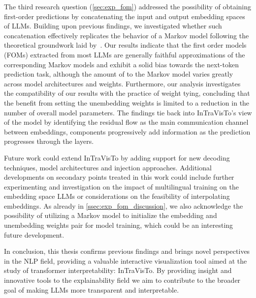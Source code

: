 The third research question (\cref{sec:exp_fom}) addressed the possibility of obtaining first-order predictions by concatenating the input and output embedding spaces of LLMs.
Building upon previous findings, we investigated whether such concatenation effectively replicates the behavior of a Markov model following the theoretical groundwork laid by~\citet{elhage2021}.
Our results indicate that the first order models (FOMs) extracted from most LLMs are generally faithful approximations of the corresponding Markov models and exhibit a solid bias towards the next-token prediction task, although the amount of  to the Markov model varies greatly across model architectures and weights.
Furthermore, our analysis investigates the compatibility of our results with the practice of weight tying, concluding that the benefit from setting the unembedding weights  is limited to a reduction in the number of overall model parameters. 
The  findings tie back into InTraVisTo's view of the model by identifying the residual flow as the main communication channel between embeddings,  components progressively add information as the prediction progresses through the layers.

Future work could extend InTraVisTo by adding support for new decoding techniques, model architectures and injection approaches.
Additional developments on  secondary points treated in this work could include further experimenting and investigation on the impact of multilingual training on the embedding space LLMs or  considerations on the feasibility of interpolating embeddings.
As already  in \cref{ssec:exp_fom_discussion}, we also acknowledge the possibility of utilizing a Markov model to initialize the embedding and unembedding weights pair for model training, which could be an interesting future development.

In conclusion, this thesis confirms previous findings and brings novel perspectives in the NLP field, providing a valuable interactive visualization tool aimed at  the study of transformer interpretability: InTraVisTo.
By providing insight and innovative tools to the explainability field we aim to contribute to the broader goal of making LLMs more transparent and interpretable.
